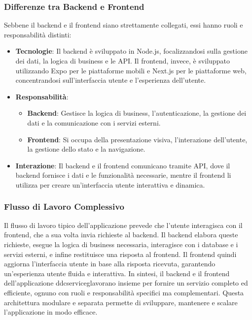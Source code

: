 \subsubsection*{Differenze tra Backend e Frontend}
Sebbene il backend e il frontend siano strettamente collegati, essi hanno ruoli e responsabilità distinti:

\begin{itemize}
    \item \textbf{Tecnologie}: Il backend è sviluppato in Node.js, focalizzandosi sulla gestione dei dati, la logica di business e le API. 
    Il frontend, invece, è sviluppato utilizzando Expo per le piattaforme mobili e Next.js per le piattaforme web, concentrandosi sull'interfaccia utente e l'esperienza dell'utente.
    
    \item \textbf{Responsabilità}: 
    \begin{itemize}
        \item \textbf{Backend}: Gestisce la logica di business, l'autenticazione, la gestione dei dati e la comunicazione con i servizi esterni.
        \item \textbf{Frontend}: Si occupa della presentazione visiva, l'interazione dell'utente, la gestione dello stato e la navigazione.
    \end{itemize}

    \item \textbf{Interazione}: Il backend e il frontend comunicano tramite API, dove il backend fornisce i dati e le funzionalità necessarie, mentre il frontend li utilizza per creare un'interfaccia utente interattiva e dinamica.
\end{itemize}

\subsubsection*{Flusso di Lavoro Complessivo}
Il flusso di lavoro tipico dell'applicazione prevede che l'utente interagisca con il frontend, che a sua volta invia richieste al backend. Il backend elabora queste richieste, esegue la logica di business necessaria, interagisce con i database e i servizi esterni, e infine restituisce una risposta al frontend.
Il frontend quindi aggiorna l'interfaccia utente in base alla risposta ricevuta, garantendo un'esperienza utente fluida e interattiva.
In sintesi, il backend e il frontend dell'applicazione \gls{ddcserviceg}\glox lavorano insieme per fornire un servizio completo ed efficiente, ognuno con ruoli e responsabilità specifici ma complementari.
Questa architettura modulare e separata permette di sviluppare, mantenere e scalare l'applicazione in modo efficace.


